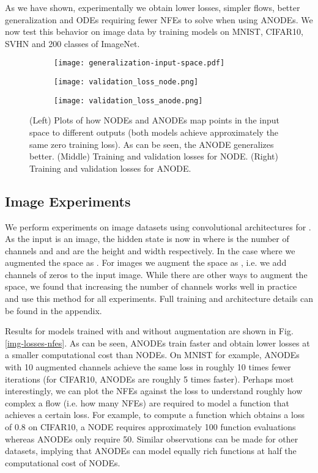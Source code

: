 \documentclass{article}
\begin{document}
As we have shown, experimentally we obtain lower losses, simpler flows, better generalization and ODEs requiring fewer NFEs to solve when using ANODEs. We now test this behavior on image data by training models on MNIST, CIFAR10, SVHN and 200 classes of  ImageNet.

\begin{figure}[b]
\vspace{-5pt}
\centering
\begin{subfigure}[t]{0.4\linewidth}
\centering
\texttt{[image: generalization-input-space.pdf]}
\end{subfigure}
\begin{subfigure}[t]{0.29\linewidth}
\centering
\texttt{[image: validation\_loss\_node.png]}
\end{subfigure}
\begin{subfigure}[t]{0.29\linewidth}
\centering
\texttt{[image: validation\_loss\_anode.png]}
\end{subfigure}
\caption{(Left) Plots of how NODEs and ANODEs map points in the input space to different outputs (both models achieve approximately the same zero training loss). As can be seen, the ANODE generalizes better. (Middle) Training and validation losses for NODE. (Right) Training and validation losses for ANODE.}
\label{generalization-fig}
\end{figure}
\vspace{-5pt}


\subsection{Image Experiments} \label{image-exp-section}
We perform experiments on image datasets using convolutional architectures for . As the input  is an image, the hidden state  is now in  where  is the number of channels and  and  are the height and width respectively. In the case where  we augmented the space as . For images we augment the space as , i.e. we add  channels of zeros to the input image. While there are other ways to augment the space, we found that increasing the number of channels works well in practice and use this method for all experiments. Full training and architecture details can be found in the appendix.



Results for models trained with and without augmentation are shown in Fig. \ref{img-losses-nfes}. As can be seen, ANODEs train faster and obtain lower losses at a smaller computational cost than NODEs. On MNIST for example, ANODEs with 10 augmented channels achieve the same loss in roughly 10 times fewer iterations (for CIFAR10, ANODEs are roughly 5 times faster). Perhaps most interestingly, we can plot the NFEs against the loss to understand roughly how complex a flow (i.e. how many NFEs) are required to model a function that achieves a certain loss. For example, to compute a function which obtains a loss of 0.8 on CIFAR10, a NODE requires approximately 100 function evaluations whereas ANODEs only require 50. Similar observations can be made for other datasets, implying that ANODEs can model equally rich functions at half the computational cost of NODEs.
\end{document}
